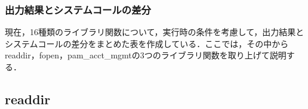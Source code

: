\documentclass[submit,techreq,noauthor]{eco}	%
\begin{document}

\subsubsection{出力結果とシステムコールの差分}
現在，16種類のライブラリ関数について，実行時の条件を考慮して，出力結果とシステムコールの差分をまとめた表を作成している．ここでは，その中からreaddir，fopen，pam\_acct\_mgmtの3つのライブラリ関数を取り上げて説明する．

\subsection{readdir}
\end{document}

